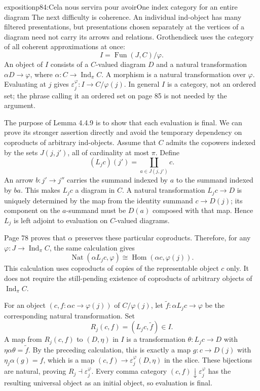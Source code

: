 \begin{dcomment}{exposition}{p84:Cela nous servira pour avoir}{One index category for an entire diagram}
The next difficulty is coherence.  An individual ind-object has many filtered presentations, but presentations chosen separately at the vertices of a diagram need not carry its arrows and relations.  Grothendieck uses the category of all coherent approximations at once:
\[
 I=\operatorname{Fun}(J,C)/\varphi.
\]
An object of $I$ consists of a $C$-valued diagram $D$ and a natural transformation $\alpha D\to\varphi$, where $\alpha:C\to\operatorname{Ind}_\pi C$.  A morphism is a natural transformation over $\varphi$.  Evaluating at $j$ gives $\varepsilon_j^\varphi:I\to C/\varphi(j)$.  In general $I$ is a category, not an ordered set; the phrase calling it an ordered set on page 85 is not needed by the argument.

The purpose of Lemma 4.4.9 is to show that each evaluation is final.  We can prove its stronger assertion directly and avoid the temporary dependency on coproducts of arbitrary ind-objects.  Assume that $C$ admits the copowers indexed by the sets $J(j,j')$, all of cardinality at most $\pi$.  Define
\[
 (L_jc)(j')=\coprod_{a\in J(j,j')}c.
\]
An arrow $b:j'\to j''$ carries the summand indexed by $a$ to the summand indexed by $ba$.  This makes $L_jc$ a diagram in $C$.  A natural transformation $L_jc\to D$ is uniquely determined by the map from the identity summand $c\to D(j)$; its component on the $a$-summand must be $D(a)$ composed with that map.  Hence $L_j$ is left adjoint to evaluation on $C$-valued diagrams.

Page 78 proves that $\alpha$ preserves these particular coproducts.  Therefore, for any $\varphi:J\to\operatorname{Ind}_\pi C$, the same calculation gives
\[
 \operatorname{Nat}(\alpha L_jc,\varphi)
 \cong\operatorname{Hom}(\alpha c,\varphi(j)).
\]
This calculation uses coproducts of copies of the representable object $c$ only.  It does not require the still-pending existence of coproducts of arbitrary objects of $\operatorname{Ind}_\pi C$.

For an object $(c,f:\alpha c\to\varphi(j))$ of $C/\varphi(j)$, let $\widetilde f:\alpha L_jc\to\varphi$ be the corresponding natural transformation.  Set
\[
 R_j(c,f)=(L_jc,\widetilde f)\in I.
\]
A map from $R_j(c,f)$ to $(D,\eta)$ in $I$ is a transformation $\theta:L_jc\to D$ with $\eta\alpha\theta=\widetilde f$.  By the preceding calculation, this is exactly a map $g:c\to D(j)$ with $\eta_j\alpha(g)=f$, which is a map $(c,f)\to\varepsilon_j^\varphi(D,\eta)$ in the slice.  These bijections are natural, proving $R_j\dashv\varepsilon_j^\varphi$.  Every comma category $(c,f)\downarrow\varepsilon_j^\varphi$ has the resulting universal object as an initial object, so evaluation is final.


\end{dcomment}
